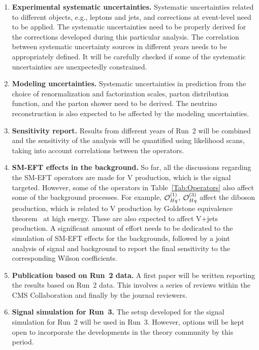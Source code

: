 \documentclass[a4paper,11pt]{article}
\renewcommand{\PV}{{{{V}}}\xspace}
\newcommand{\VH}{{{\PV}{\PH}}\xspace}
\begin{document}
\begin{enumerate}[noitemsep,topsep=0pt]
\item {\bf Experimental systematic uncertainties.} Systematic uncertainties related to different objects, e.g., leptons and jets, and corrections at event-level need to be applied. 
The systematic uncertainties need to be properly derived for the corrections developed during this particular analysis. 
The correlation between systematic uncertainty sources in different years needs to be appropriately defined. 
It will be carefully checked if some of the systematic uncertainties are unexpectedly constrained. 

\item {\bf Modeling uncertainties.} Systematic uncertainties in prediction from the choice of renormalization and factorization scales, parton distribution function, and the parton shower need to be derived. 
The neutrino reconstruction is also expected to be affected by the modeling uncertainties. 

\item {\bf Sensitivity report.} Results from different years of Run~2 will be combined and
the sensitivity of the analysis will be quantified using likelihood scans, taking into account correlations between the operators. 

\item {\bf SM-EFT effects in the background.} So far, all the discussions regarding the SM-EFT operators are made for \VH production, which is the signal targeted. However, some of the operators in Table~\ref{Tab:Operators} also affect some of the background processes. 
For example, ${\cal O}^{(1)}_{Hq}$, ${\cal O}^{(3)}_{Hq}$ affect the diboson production, which is related to \VH production by Goldstone equivalence theorem~\cite{PhysRevD.10.1145} at high energy. 
These are also expected to affect {\PV}+jets production. 
A significant amount of effort needs to be dedicated to the simulation of SM-EFT effects for the backgrounds, followed by a joint analysis of signal and background to report the final sensitivity to the corresponding Wilson coefficients. 

\item {\bf Publication based on Run~2 data.} A first paper will be written reporting the results based on Run~2 data. This involves a series of reviews within the CMS Collaboration and finally by the journal reviewers. 

\item {\bf Signal simulation for Run~3.} The setup developed for the signal simulation for Run~2 will be used in Run~3. However, options will be kept open to incorporate the developments in the theory community by this period. 


\end{enumerate}
\end{document}
